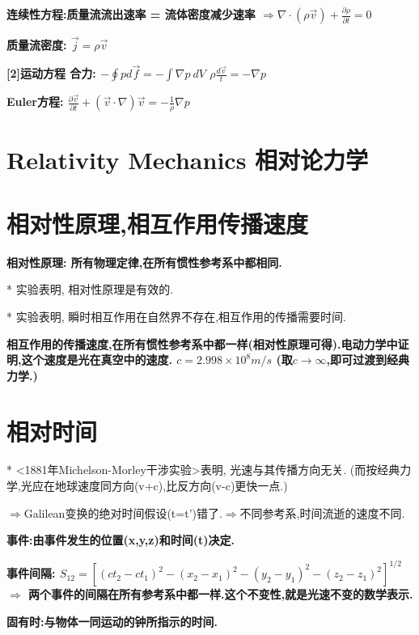         \bf{连续性方程}:质量流流出速率 = 流体密度减少速率
            $\Rightarrow \nabla \cdot (\rho \vec v) +  \frac{\partial \rho}{\partial t} = 0$
        
        \bf{质量流密度}:
            $\vec j = \rho \vec v$
        
        \bf{[2]运动方程}
            合力:
            $-\oint p d \vec f = -\int \nabla p\ dV$
            $\rho \frac{d \vec v}{t} = -\nabla p$
        
        \bf{Euler方程}:
            $\frac{\partial \vec v}{\partial t} + (\vec v \cdot \nabla)\vec v = - \frac{1}{\rho}\nabla p$


\section{Relativity Mechanics 相对论力学}
    \section{相对性原理,相互作用传播速度}
        \bf{相对性原理}: 所有物理定律,在所有惯性参考系中都相同.
        
        * 实验表明, 相对性原理是有效的.
        
        * 实验表明, 瞬时相互作用在自然界不存在,相互作用的传播需要时间.
        
        \bf{相互作用的传播速度},在所有惯性参考系中都一样(相对性原理可得).\quad 电动力学中证明,这个速度是光在真空中的速度.
            $c = 2.998 \times 10^8 m/s$
            (取$c\to \infty$,即可过渡到经典力学.)


    \section{相对时间}
        * <1881年Michelson-Morley干涉实验>表明, 光速与其传播方向无关. (而按经典力学,光应在地球速度同方向(v+c),比反方向(v-c)更快一点.)
        
        $\Rightarrow$Galilean变换的绝对时间假设(t=t')错了.\quad  $\Rightarrow$不同参考系,时间流逝的速度不同.
        
        \bf{事件}:由事件发生的位置(x,y,z)和时间(t)决定.
        
        \bf{事件间隔}:
            $S_{12} = [(ct_2-ct_1)^2 - (x_2-x_1)^2 - (y_2-y_1)^2 - (z_2-z_1)^2]^{1/2}$
            $\Rightarrow$ 两个事件的间隔在所有参考系中都一样.\quad 这个不变性,就是光速不变的数学表示.
        
        \bf{固有时}:与物体一同运动的钟所指示的时间.
        
